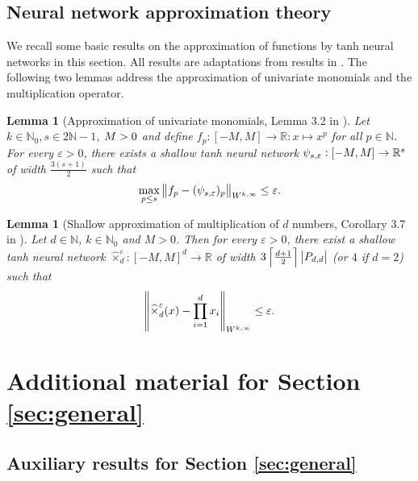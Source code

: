 \documentclass{article}
\numberwithin{equation}{section}
\newcommand{\R}{\mathbb{R}}
\newcommand{\N}{\mathbb{N}}
\renewcommand{\epsilon}{\varepsilon}
\newcommand{\1}{\mathbbm{1}}
\newcommand{\ck}[1]{\norm{#1}_{W^{k,\infty}}}
\newtheorem{lemma}[theorem]{Lemma}
\begin{document}
\subsection{Neural network approximation theory}\label{app:nnt}

We recall some basic results on the approximation of functions by tanh neural networks in this section. All results are adaptations from results in \cite{deryck2021approximation}. The following two lemmas address the approximation of univariate monomials and the multiplication operator. 

\begin{lemma}[Approximation of univariate monomials, Lemma 3.2 in \cite{deryck2021approximation}]\label{lem:pol-tanh}
Let $k\in\mathbb{N}_0, s\in 2\mathbb{N}-1$,  ${\color{black}M>0}$ and define $f_p:[-M,M]\to\R: x\mapsto x^p$ for all $p\in \N$. For every $\epsilon>0$, there exists a shallow tanh neural network $\psi_{s,{\color{black}\epsilon}} : {\color{black}[-M,M]}\to \mathbb{R}^s$ of width $\frac{3(s+1)}{2}$ such that 
\begin{equation}
    \max_{p\leq s} \ck{f_p- (\psi_{s,\epsilon})_p} \leq\epsilon.
\end{equation}
\end{lemma}

\begin{lemma}[Shallow approximation of multiplication of $d$ numbers, Corollary 3.7 in \cite{deryck2021approximation}]\label{lem:mult-shallow}
Let $d\in \mathbb{N}$, $k\in \mathbb{N}_0$ and $M>0$. Then for every $\epsilon>0$, there exist a shallow tanh neural network $\widehat{\times}_d^\epsilon: [-M,M]^d\to\mathbb{R}$ of width $3\left\lceil\frac{d+1}{2}\right\rceil\abs{P_{d,d} }$ (or $4$ if $d=2$) such that
\begin{equation}
   \ck{\widehat{\times}_d^\epsilon(x)-\prod_{i=1}^d x_i} \leq \epsilon.
\end{equation}
\end{lemma}

\section{Additional material for Section \ref{sec:general}}\label{app:general}

\subsection{Auxiliary results for Section \ref{sec:general}}
\end{document}
